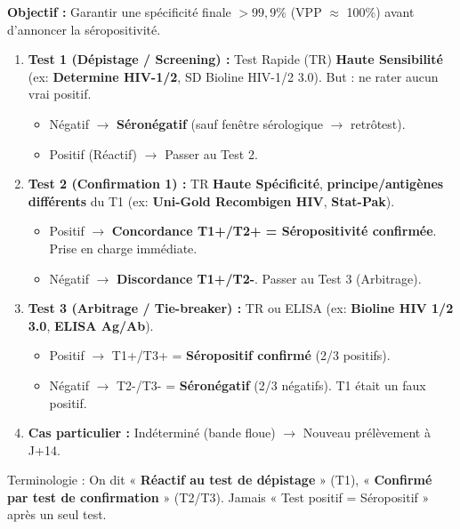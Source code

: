 \documentclass[11pt]{article}
\newcommand{\cle}[1]{{\popxbold\color{popdark}#1}}
\begin{document}
\begin{methode}
\textbf{Objectif :} Garantir une spécificité finale $> 99,9\%$ (VPP $\approx$ 100\%) avant d'annoncer la séropositivité.
\begin{enumerate}
    \item \textbf{Test 1 (Dépistage / Screening) :} Test Rapide (TR) \textbf{Haute Sensibilité} (ex: \textbf{Determine HIV-1/2}, SD Bioline HIV-1/2 3.0). But : ne rater aucun vrai positif.
    \begin{itemize}
        \item Négatif $\rightarrow$ \textbf{Séronégatif} (sauf fenêtre sérologique $\rightarrow$ retrôtest).
        \item Positif (Réactif) $\rightarrow$ Passer au Test 2.
    \end{itemize}
    \item \textbf{Test 2 (Confirmation 1) :} TR \textbf{Haute Spécificité}, \textbf{principe/antigènes différents} du T1 (ex: \textbf{Uni-Gold Recombigen HIV}, \textbf{Stat-Pak}).
    \begin{itemize}
        \item Positif $\rightarrow$ \textbf{Concordance T1+/T2+ = Séropositivité confirmée}. Prise en charge immédiate.
        \item Négatif $\rightarrow$ \textbf{Discordance T1+/T2-}. Passer au Test 3 (Arbitrage).
    \end{itemize}
    \item \textbf{Test 3 (Arbitrage / Tie-breaker) :} TR ou ELISA (ex: \textbf{Bioline HIV 1/2 3.0}, \textbf{ELISA Ag/Ab}).
    \begin{itemize}
        \item Positif $\rightarrow$ T1+/T3+ = \textbf{Séropositif confirmé} (2/3 positifs).
        \item Négatif $\rightarrow$ T2-/T3- = \textbf{Séronégatif} (2/3 négatifs). T1 était un faux positif.
    \end{itemize}
    \item \textbf{Cas particulier :} Indéterminé (bande floue) $\rightarrow$ Nouveau prélèvement à J+14.
\end{enumerate}
\cle{Terminologie :} On dit « \textbf{Réactif au test de dépistage} » (T1), « \textbf{Confirmé par test de confirmation} » (T2/T3). Jamais « Test positif = Séropositif » après un seul test.
\end{methode}
\end{document}
